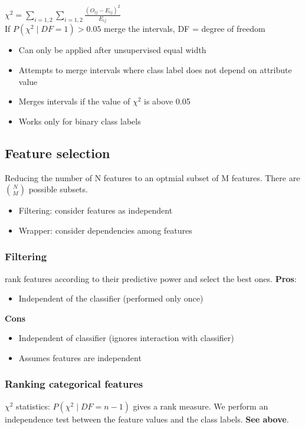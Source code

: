 $ \chi^2 = \sum_{i=1,2} \sum_{i=1,2} \frac{(O_{ij} -
  E_{ij})^2}{E_{ij}} $ \\

If $ P(\chi^2 \mid DF = 1) > 0.05 $ merge the intervals, DF = degree
of freedom

\begin{itemize}
\item Can only be applied after unsupervised equal width
\item Attempts to merge intervals where class label does not depend on
  attribute value
\item Merges intervals if the value of $\chi^2$ is above 0.05
\item Works only for binary class labels
\end{itemize}

\subsection{Feature selection}

Reducing the number of N features to an optmial subset of M
features. There are $ \binom{N}{M} $ possible subsets.

\begin{itemize}
\item Filtering: consider features as independent
\item Wrapper: consider dependencies among features
\end{itemize}

\subsubsection{Filtering}
rank features according to their predictive power and select the best
ones. \textbf{Pros}:
\begin{itemize}
\item Independent of the classifier (performed only once)
\end{itemize}
\textbf{Cons}
\begin{itemize}
\item Independent of classifier (ignores interaction with classifier)
\item Assumes features are independent
\end{itemize}

\subsubsection{Ranking categorical features}
$ \chi^2 $ statistics: $ P(\chi^2 \mid DF = n - 1) $ gives a rank
measure. We perform an independence test between the feature values
and the class labels. \textbf{See above}.

